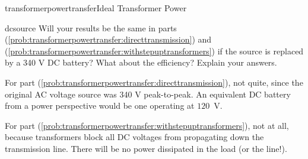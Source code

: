 \begin{mainquestion}{transformerpowertransfer}{Ideal Transformer Power}
\begin{partquestion}{dcsource}
{Will your results be the same in parts (\cref{prob:transformerpowertransfer:directtransmission}) and (\cref{prob:transformerpowertransfer:withstepuptransformers}) if the source is replaced by a 340 V DC battery? What about the efficiency? Explain your answers.}

\begin{answer}
For part (\cref{prob:transformerpowertransfer:directtransmission}), not quite, since the original AC voltage source was 340 V peak-to-peak. An equivalent DC battery from a power perspective would be one operating at $120$~V.

For part (\cref{prob:transformerpowertransfer:withstepuptransformers}), not at all, because transformers block all DC voltages from propagating down the transmission line. There will be no power dissipated in the load (or the line!).
\end{answer}
\end{partquestion}

\end{mainquestion}
